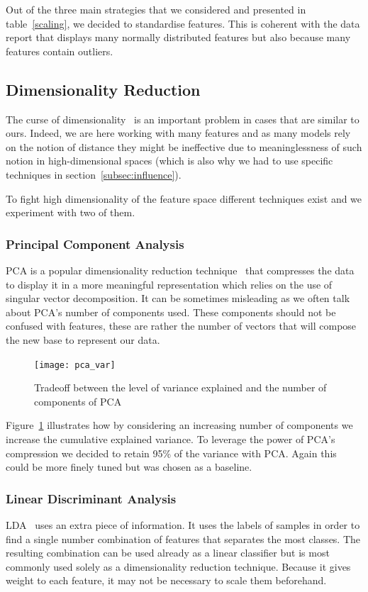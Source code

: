 Out of the three main strategies that we considered and presented in table~\ref{scaling}, we decided to standardise features. This is coherent with the data report that displays many normally distributed features but also because many features contain outliers.

\subsection{Dimensionality Reduction}
The curse of dimensionality~\cite{wiki:curse} is an important problem in cases that are similar to ours. Indeed, we are here working with many features and as many models rely on the notion of distance they might be ineffective due to meaninglessness of such notion in high-dimensional spaces (which is also why we had to use specific techniques in section~\ref{subsec:influence}).

To fight high dimensionality of the feature space different techniques exist and we experiment with two of them.

\subsubsection{Principal Component Analysis}
PCA is a popular dimensionality reduction technique~\cite{pca} that compresses the data to display it in a more meaningful representation which relies on the use of singular vector decomposition. It can be sometimes misleading as we often talk about PCA's number of components used. These components should not be confused with features, these are rather the number of vectors that will compose the new base to represent our data. 

\begin{figure}[ht]
    \begin{center}
    \texttt{[image: pca\_var]}
    \end{center}
    \caption{Tradeoff between the level of variance explained and the number of components of PCA}
    \label{pca_var}
\end{figure}

Figure~\ref{pca_var} illustrates how by considering an increasing number of components we increase the cumulative explained variance. To leverage the power of PCA's compression we decided to retain 95\% of the variance with PCA. Again this could be more finely tuned but was chosen as a baseline. 

\subsubsection{Linear Discriminant Analysis}
LDA~\cite{wiki:lda} uses an extra piece of information. It uses the labels of samples in order to find a single number combination of features that separates the most classes. The resulting combination can be used already as a linear classifier but is most commonly used solely as a dimensionality reduction technique. Because it gives weight to each feature, it may not be necessary to scale them beforehand. 

